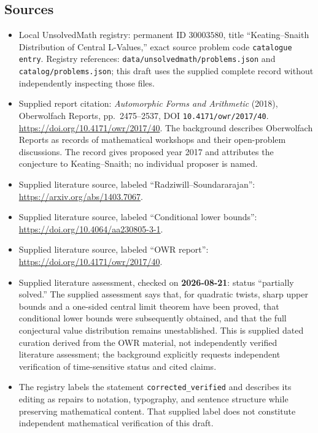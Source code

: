 \documentclass[11pt]{article}
\begin{document}
\subsection{Sources}
\begin{itemize}
\item Local UnsolvedMath registry: permanent ID \(30003580\), title ``Keating--Snaith Distribution of Central L-Values,'' exact source problem code \texttt{catalogue entry}. Registry references: \texttt{data/unsolvedmath/problems.json} and \texttt{catalog/problems.json}; this draft uses the supplied complete record without independently inspecting those files.
\item Supplied report citation: \emph{Automorphic Forms and Arithmetic} (2018), Oberwolfach Reports, pp.~2475--2537, DOI \texttt{10.4171/owr/2017/40}. \url{https://doi.org/10.4171/owr/2017/40}. The background describes Oberwolfach Reports as records of mathematical workshops and their open-problem discussions. The record gives proposed year 2017 and attributes the conjecture to Keating--Snaith; no individual proposer is named.
\item Supplied literature source, labeled ``Radziwill--Soundararajan'': \url{https://arxiv.org/abs/1403.7067}.
\item Supplied literature source, labeled ``Conditional lower bounds'': \url{https://doi.org/10.4064/aa230805-3-1}.
\item Supplied literature source, labeled ``OWR report'': \url{https://doi.org/10.4171/owr/2017/40}.
\item Supplied literature assessment, checked on \textbf{2026-08-21}: status ``partially solved.'' The supplied assessment says that, for quadratic twists, sharp upper bounds and a one-sided central limit theorem have been proved, that conditional lower bounds were subsequently obtained, and that the full conjectural value distribution remains unestablished. This is supplied dated curation derived from the OWR material, not independently verified literature assessment; the background explicitly requests independent verification of time-sensitive status and cited claims.
\item The registry labels the statement \texttt{corrected\_verified} and describes its editing as repairs to notation, typography, and sentence structure while preserving mathematical content. That supplied label does not constitute independent mathematical verification of this draft.
\end{itemize}
\end{document}
